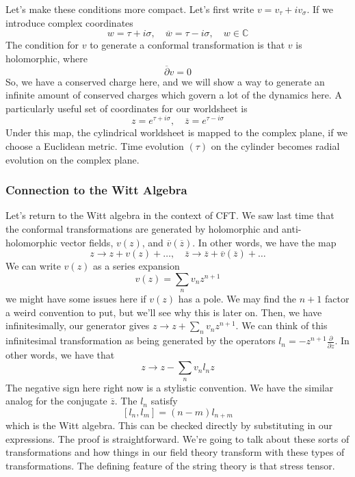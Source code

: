 \documentclass[11pt, oneside]{article}   	%
\theoremstyle{slanted}
\begin{document}
Let's make these conditions more compact. 
Let's first write $ v  = v _ \tau + i v _ \sigma $. 
If we introduce 
complex coordinates 
\[
 w = \tau + i \sigma ,\quad  \overline{ w }   = \tau  - i \sigma , \quad 
 w \in \mathbb{ C } 
\] The condition for $ v $ to generate a conformal transformation 
is that $ v  $ is holomorphic, 
where 
\[
 \overline{ \partial   }v = 0  
\] So, we have a 
conserved charge here, and we will show a 
way to generate an infinite amount of conserved 
charges which govern a lot of the dynamics here. 
A particularly useful 
set of coordinates for our 
worldsheet is 
\[
  z  = e ^{ \tau + i \sigma }, \quad 
 \overline{ z }  = e ^{ \tau  - i \sigma }
\] Under this map, the cylindrical worldsheet is 
mapped to the complex plane, 
if we choose a Euclidean metric. 
Time evolution $ \left( \tau   \right)   $ 
on the cylinder becomes radial evolution 
on the complex plane.

\subsubsection{Connection to the Witt Algebra}
Let's return to the Witt algebra in the context 
of CFT. 
We saw last time that the conformal transformations 
are generated by holomorphic and anti-holomorphic 
vector fields, $ v \left( z  \right)  $, and $ \overline{ v } \left( 
\overline{ z } \right)  $. 
In other words, we 
have the map 
\[
  z \to z + v \left( z  \right)  + \dots, \quad \overline{ z } \to 
  \overline{ z } + \overline{ v } \left( \overline{ z }  \right)  + \dots
\]  We can write $ v \left( z  \right)  $ as a series expansion 
\[
 v \left( z   \right)   = \sum _ n v _ n z ^{ n + 1  } 
\] we might have some issues here if 
$ v \left( z  \right)  $ has a pole. 
We may find the $ n + 1 $ factor a weird convention to put, 
but we'll see why this is later on. 
Then, we have infinitesimally, our generator gives 
$ z \to z + \sum _ n v _ n z ^{ n + 1 } $. 
We can think of this infinitesimal transformation 
as being generated by the operators $ l _ n  =  -z ^{ n + 1 } 
\frac{\partial }{\partial z} $. 
In other words, we have that 
\[
 z \to z  - \sum _ n v _ n l_ n  z 
\] The negative sign 
here right now is a stylistic convention. We have the similar analog for the 
conjugate $ \overline{  z  } $. 
The $ l_ n  $  satisfy
\[
 \left[  l _ n , l _ m  \right]   = 
 \left( n - m  \right)  l _{ n + m } 
\] which is the Witt algebra. This can 
be checked directly by substituting in 
our expressions. The proof is straightforward.  
We're going to talk about these sorts of transformations 
and how things in our field theory 
transform with these types of transformations. 
The defining feature of the string theory is that 
stress tensor. 
\end{document}
